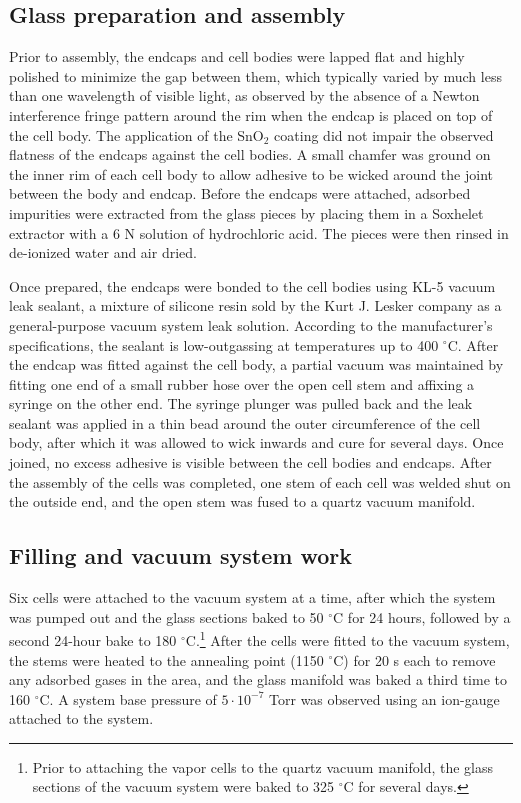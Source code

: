 \documentclass [10pt, twoside] {uwthesis}[2012/04/02]
\begin{document}
\subsection{Glass preparation and assembly}
Prior to assembly, the endcaps and cell bodies were lapped flat and highly polished to minimize the gap between them, which typically varied by much less than one wavelength of visible light, as observed by the absence of a Newton interference fringe pattern around the rim when the endcap is placed on top of the cell body. The application of the SnO$_2$ coating did not impair the observed flatness of the endcaps against the cell bodies. A small chamfer was ground on the inner rim of each cell body to allow adhesive to be wicked around the joint between the body and endcap.  Before the endcaps were attached, adsorbed impurities were extracted from the glass pieces by placing them in a Soxhelet extractor with a 6 N solution of hydrochloric acid. The pieces were then rinsed in de-ionized water and air dried.

Once prepared, the endcaps were bonded to the cell bodies using KL-5 vacuum leak sealant, a mixture of silicone resin sold by the Kurt J. Lesker company as a general-purpose vacuum system leak solution. According to the manufacturer's specifications, the sealant is low-outgassing at temperatures up to 400 $^{\circ}$C. After the endcap was fitted against the cell body, a partial vacuum was maintained by fitting one end of a small rubber hose over the open cell stem and affixing a syringe on the other end. The syringe plunger was pulled back and the leak sealant was applied in a thin bead around the outer circumference of the cell body, after which it was allowed to wick inwards and cure for several days. Once joined, no excess adhesive is visible between the cell bodies and endcaps. After the assembly of the cells was completed, one stem of each cell was welded shut on the outside end, and the open stem was fused to a quartz vacuum manifold. 

\subsection{Filling and vacuum system work}
Six cells were attached to the vacuum system at a time, after which the system was pumped out and the glass sections baked to 50 $^{\circ}$C for 24 hours, followed by a second 24-hour bake to 180 $^{\circ}$C.\footnote{Prior to attaching the vapor cells to the quartz vacuum manifold, the glass sections of the vacuum system were baked to 325 $^{\circ}$C for several days.} After the cells were fitted to the vacuum system, the stems were heated to the annealing point (1150 $^{\circ}$C) for 20 s each to remove any adsorbed gases in the area, and the glass manifold was baked a third time to 160 $^{\circ}$C. A system base pressure of $5\cdot10^{-7}$ Torr was observed using an ion-gauge attached to the system.
\end{document}
